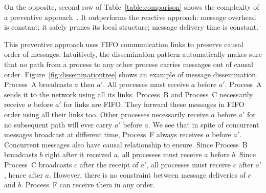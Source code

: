 




On the opposite, second row of Table~\ref{table:comparison} shows the complexity
of a preventive approach~\cite{friedman2004causal}. It outperforms the reactive
approach: message overhead is constant; it safely prunes its local structure;
message delivery time is constant.

This preventive approach uses FIFO communication links to preserve causal order
of messages. Intuitively, the dissemination pattern automatically makes sure
that no path from a process to any other process carries messages out of causal
order. Figure~\ref{fig:disseminationtree} shows an example of message
dissemination. Process~A broadcasts $a$ then $a'$. All processes must receive
$a$ before $a'$. Process~A sends it to the network using all its
links. Process~B and Process~C necessarily receive $a$ before $a'$ for links are
FIFO. They forward these messages in FIFO order using all their links too.
Other processes necessarily receive $a$ before $a'$ for no subsequent path will
ever carry $a'$ before $a$.  We see that in spite of concurrent messages
broadcast at different time, Process~F always receives $a$ before
$a'$. Concurrent messages also have causal relationship to ensure.  Since
Process~B broadcasts $b$ right after it received $a$, all processes must receive
$a$ before $b$. Since Process~C broadcasts $c$ after the receipt of $a'$, all
processes must receive $c$ after $a'$, hence after $a$. However, there is no
constraint between message deliveries of $c$ and $b$. Process~F can receive them
in any order.


